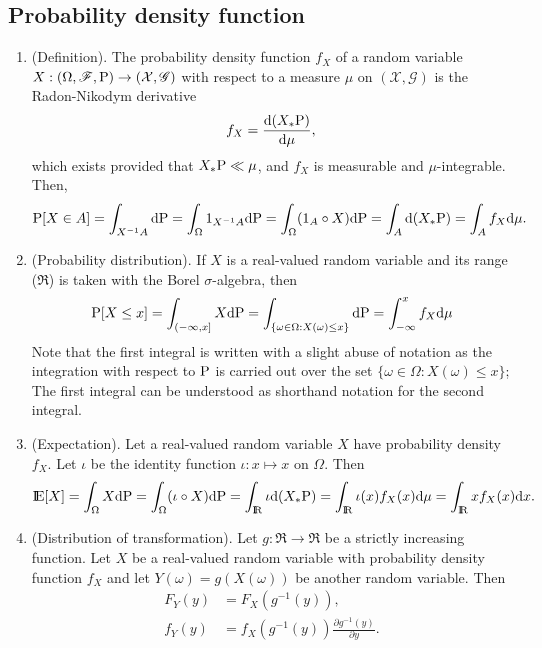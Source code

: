\documentclass[a4paper,10pt]{article}
\begin{document}
\subsection{Probability density function}
\begin{enumerate}
 \item (Definition).
    The probability density function $f_X$ of a random variable $X:(\Omega,\mathscr{F},\mathrm{P})\to (\mathcal{X},\mathscr{G})$
    with respect to a measure $\mu$ on $(\mathcal{X},\mathscr{G})$ is the Radon-Nikodym derivative
    \[
     f_X = \frac{\mathrm{d} (X_*\mathrm{P})}{\mathrm{d} \mu},
    \]
    which exists provided that $X_*\mathrm{P} \ll \mu$, and $f_X$ is measurable and $\mu$-integrable. Then,
    \begin{align*}
     \mathrm{P}[X\in A] = \int_{X^{-1}A}\mathrm{d} \mathrm{P}
                   = \int_{\Omega} 1_{X^{-1}A}\mathrm{d}\mathrm{P}
                   = \int_{\Omega} (1_{A}\circ X)\mathrm{d}\mathrm{P}
                   = \int_{A}\mathrm{d}(X_*\mathrm{P})
                   = \int_A f_X \mathrm{d} \mu.
    \end{align*}
  \item (Probability distribution).
	If $X$ is a real-valued random variable and its range ($\Re$) is taken with the 
        Borel $\sigma$-algebra, then 
        \begin{align*}
         \mathrm{P}[X\leq x] = \int_{(-\infty, x]}X\mathrm{d} \mathrm{P}
         = \int_{\{\omega\in\Omega: X(\omega) \leq x\}}\mathrm{d} \mathrm{P}
         = \int_{-\infty}^x f_X\mathrm{d} \mu
        \end{align*}
        Note that the first integral is written with a slight abuse of notation as the 
        integration with respect to $\mathrm{P}$ is carried out over the set $\{\omega\in\Omega: X(\omega) \leq x\}$;
        The first integral can be understood as shorthand notation for the second integral.
  \item (Expectation).
	Let a real-valued random variable $X$ have probability density $f_X$. Let $\iota$
	be the identity function $\iota:x\mapsto x$ on $\Omega$. Then
        \[
         \E[X] = \int_\Omega X\d\prob 
               = \int_\Omega (\iota\circ X)\d\prob 
               = \int_\Re \iota\d(X_*\prob)
               = \int_\Re \iota(x) f_X(x) \d\mu
               = \int_\Re x f_X(x) \d x.
        \]
  \item (Distribution of transformation). Let $g:\Re\to\Re$ be a strictly increasing function. 
         Let $X$ be a real-valued random variable with probability density function $f_X$ 
         and let $Y(\omega) = g(X(\omega))$ be another random variable. Then
  \begin{align*}
   F_Y(y) &= F_X(g^{-1}(y)),\\
   f_Y(y) &= f_X(g^{-1}(y))\frac{\partial g^{-1}(y)}{\partial y}.
  \end{align*}
  

\end{enumerate}
\end{document}
